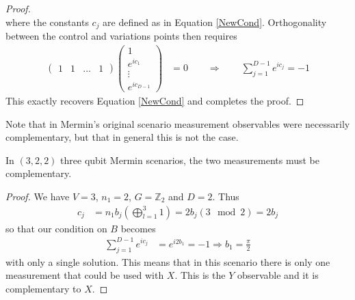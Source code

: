 \begin{proof}
\[\]
where the constants $c_j$ are defined as in Equation \ref{NewCond}.
Orthogonality between the control and variations points then requires
\begin{align*}
\left(\begin{array}{cccc}1 & 1 & ... & 1 \end{array}\right)
\left(\begin{array}{c}1 \\ e^{ic_1} \\\vdots \\ e^{ic_{D-1}} \end{array}\right) &= 0 \qquad \Rightarrow \qquad
\sum_{j=1}^{D-1}e^{ic_j} = -1
\end{align*}
This exactly recovers Equation \ref{NewCond} and completes the proof.
\end{proof} 

Note that in Mermin's original scenario  measurement observables were necessarily complementary, but that in general this is not the case.
\begin{theorem}
\label{thm:qubitcase}
In $(3,2,2)$ three qubit Mermin scenarios, the two measurements must be complementary.
\end{theorem}
\begin{proof}
We have $V=3$, $n_1 = 2$, $G=\mathbb{Z}_2$ and $D = 2$. Thus
\begin{align*}
c_j &= n_1 b_j \left(\bigoplus^3_{l=1}1\right)= 2b_j (3 \mod 2) = 2b_j
\end{align*}
so that our condition on $B$ becomes
\begin{align*}
\sum_{j=1}^{D-1}e^{ic_j} &= e^{i2b_1} = -1 \Rightarrow
b_1 = \frac{\pi}{2}
\end{align*}
with only a single solution.  This means that in this scenario there is only one measurement that could be used with $X$.  This is the $Y$ observable and it is complementary to $X$.
\end{proof}

